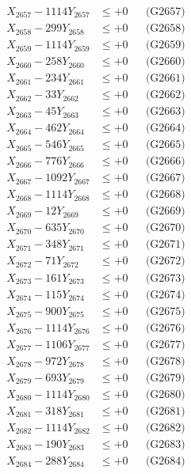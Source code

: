 \documentclass[a4paper,10pt]{article}
\begin{document}
{\begin{align}
X_{2657} - 1114Y_{2657} &\leq +0 && \text{(G2657)} \\
X_{2658} - 299Y_{2658} &\leq +0 && \text{(G2658)} \\
X_{2659} - 1114Y_{2659} &\leq +0 && \text{(G2659)} \\
X_{2660} - 258Y_{2660} &\leq +0 && \text{(G2660)} \\
\allowbreak
X_{2661} - 234Y_{2661} &\leq +0 && \text{(G2661)} \\
X_{2662} - 33Y_{2662} &\leq +0 && \text{(G2662)} \\
X_{2663} - 45Y_{2663} &\leq +0 && \text{(G2663)} \\
X_{2664} - 462Y_{2664} &\leq +0 && \text{(G2664)} \\
X_{2665} - 546Y_{2665} &\leq +0 && \text{(G2665)} \\
X_{2666} - 776Y_{2666} &\leq +0 && \text{(G2666)} \\
X_{2667} - 1092Y_{2667} &\leq +0 && \text{(G2667)} \\
X_{2668} - 1114Y_{2668} &\leq +0 && \text{(G2668)} \\
X_{2669} - 12Y_{2669} &\leq +0 && \text{(G2669)} \\
X_{2670} - 635Y_{2670} &\leq +0 && \text{(G2670)} \\
\allowbreak
X_{2671} - 348Y_{2671} &\leq +0 && \text{(G2671)} \\
X_{2672} - 71Y_{2672} &\leq +0 && \text{(G2672)} \\
X_{2673} - 161Y_{2673} &\leq +0 && \text{(G2673)} \\
X_{2674} - 115Y_{2674} &\leq +0 && \text{(G2674)} \\
X_{2675} - 900Y_{2675} &\leq +0 && \text{(G2675)} \\
X_{2676} - 1114Y_{2676} &\leq +0 && \text{(G2676)} \\
X_{2677} - 1106Y_{2677} &\leq +0 && \text{(G2677)} \\
X_{2678} - 972Y_{2678} &\leq +0 && \text{(G2678)} \\
X_{2679} - 693Y_{2679} &\leq +0 && \text{(G2679)} \\
X_{2680} - 1114Y_{2680} &\leq +0 && \text{(G2680)} \\
\allowbreak
X_{2681} - 318Y_{2681} &\leq +0 && \text{(G2681)} \\
X_{2682} - 1114Y_{2682} &\leq +0 && \text{(G2682)} \\
X_{2683} - 190Y_{2683} &\leq +0 && \text{(G2683)} \\
X_{2684} - 288Y_{2684} &\leq +0 && \text{(G2684)} \\

\end{align}}
\end{document}
